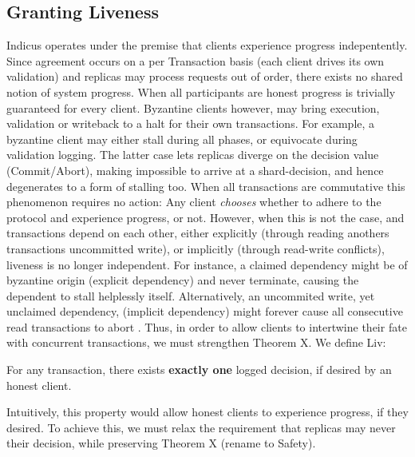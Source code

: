 \subsection{Granting Liveness}
Indicus operates under the premise that clients experience progress indepentently. Since agreement occurs on a per Transaction basis (each client drives its own validation) and replicas may process requests out of order, there exists no shared notion of system progress. When all participants are honest progress is trivially guaranteed for every client. Byzantine clients however, may bring execution, validation or writeback to a halt for their own transactions. For example, a byzantine client may either stall during all phases, or equivocate during validation logging. The latter case lets replicas diverge on the decision value (Commit/Abort), making impossible to arrive at a shard-decision, and hence degenerates to a form of stalling too. When all transactions are commutative this phenomenon requires no action: Any client \textit{chooses} whether to adhere to the protocol and experience progress, or not. However, when this is not the case, and transactions depend on each other, either explicitly (through reading anothers transactions uncommitted write), or implicitly (through read-write conflicts), liveness is no longer independent. For instance, a claimed dependency might be of byzantine origin (explicit dependency) and never terminate, causing the dependent to stall helplessly itself. Alternatively, an uncommited write, yet unclaimed dependency, (implicit dependency) might forever cause all consecutive read transactions to abort  .
Thus, in order to allow clients to intertwine their fate with concurrent transactions, we must strengthen Theorem X. We define Liv:

\begin{theorem} 
For any transaction, there exists \textbf{exactly one} logged decision, if desired by an honest client.
\end{theorem}
Intuitively, this property would allow honest clients to experience progress, if they desired. To achieve this, we must relax the requirement that replicas may never their decision, while preserving Theorem X (rename to Safety).


